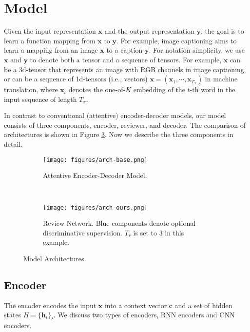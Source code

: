 \documentclass{article}
\begin{document}
\section{Model}%
Given the input representation $\mathbf{x}$ and the output representation $\mathbf{y}$, the goal is to learn a function mapping from $\mathbf{x}$ to $\mathbf{y}$.  For example, image captioning aims to learn a mapping from an image $\mathbf{x}$ to a caption $\mathbf{y}$. For notation simplicity, we use $\mathbf{x}$ and $\mathbf{y}$ to denote both a tensor and a sequence of tensors. For example, $\mathbf{x}$ can be a 3d-tensor that represents an image with RGB channels in image captioning, or can be a sequence of 1d-tensors (i.e., vectors) $\mathbf{x} = (\mathbf{x}_1, \cdots, \mathbf{x}_{T_x})$ in machine translation, where $\mathbf{x}_t$ denotes the one-of-$K$ embedding of the $t$-th word in the input sequence of length $T_x$.

In contrast to conventional (attentive) encoder-decoder models, our model consists of three components, encoder, reviewer, and decoder. The comparison of architectures is shown in Figure \ref{fig:arch}. Now we describe the three components in detail.

\begin{figure}
    \centering
    \begin{subfigure}[t]{0.28\textwidth}
        \texttt{[image: figures/arch-base.png]}
        \caption{\small Attentive Encoder-Decoder Model.}
        \label{fig:arch-base}
    \end{subfigure}
    ~~~~~~~
    \begin{subfigure}[t]{0.6\textwidth}
        \texttt{[image: figures/arch-ours.png]}
        \caption{\small Review Network. Blue components denote optional discriminative supervision. $T_r$ is set to $3$ in this example.}
        \label{fig:arch-ours}
    \end{subfigure}
    \caption{\small Model Architectures.}\label{fig:arch}
\end{figure}\subsection{Encoder}\label{sec:cnn}

The encoder encodes the input $\mathbf{x}$ into a context vector $\mathbf{c}$ and a set of hidden states $H = \{\mathbf{h}_t\}_t$. We discuss two types of encoders, RNN encoders and CNN encoders.
\end{document}
